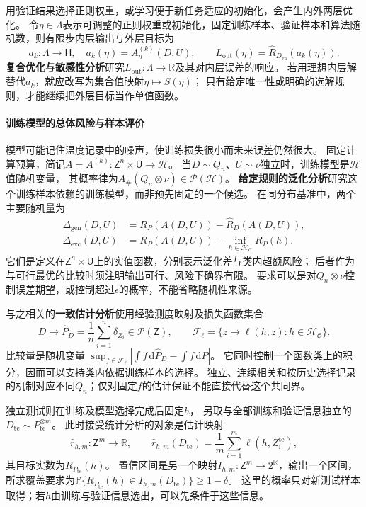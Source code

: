 用验证结果选择正则权重，或学习便于新任务适应的初始化，会产生内外两层优化。
令$\eta\in\Lambda$表示可调整的正则权重或初始化，固定训练样本、验证样本和算法随机数，则有限步内层输出与外层目标为
\[
  a_k:\Lambda\to\mathsf H,\quad a_k(\eta)=A_\eta^{(k)}(D,U),
  \qquad L_{\mathrm{out}}(\eta)=\widehat R_{D_{\mathrm{va}}}(a_k(\eta)).
\]
\textbf{复合优化与敏感性分析}研究$L_{\mathrm{out}}:\Lambda\to\mathbb R$及其对内层误差的响应。
若用理想内层解替代$a_k$，就应改写为集合值映射$\eta\mapsto S(\eta)$；
只有给定唯一性或明确的选解规则，才能继续把外层目标当作单值函数。

\paragraph{训练模型的总体风险与样本评价}
\label{sec:future-ml-generalization-evaluation}

模型可能记住温度记录中的噪声，使训练损失很小而未来误差仍然很大。
固定计算预算，简记$A=A^{(k)}:\mathsf Z^n\times\mathsf U\to\mathcal H$。
当$D\sim Q_n$、$U\sim\nu$独立时，训练模型是$\mathcal H$值随机变量，
其概率律为$A_{\#}(Q_n\otimes\nu)\in\mathcal P(\mathcal H)$。
\textbf{给定规则的泛化分析}研究这个训练样本依赖的训练模型，而非预先固定的一个候选。
在同分布基准中，两个主要随机量为
\[
  \begin{aligned}
    \Delta_{\mathrm{gen}}(D,U)
      &=R_P(A(D,U))-\widehat R_D(A(D,U)),\\
    \Delta_{\mathrm{exc}}(D,U)
      &=R_P(A(D,U))-\inf_{h\in\mathcal H_{\mathcal C}}R_P(h).
  \end{aligned}
\]
它们是定义在$\mathsf Z^n\times\mathsf U$上的实值函数，分别表示泛化差与类内超额风险；
后者作为与可行最优的比较时须注明输出可行、风险下确界有限。
要求可以是对$Q_n\otimes\nu$控制误差期望，或控制超过$\epsilon$的概率，不能省略随机性来源。

与之相关的\textbf{一致估计分析}使用经验测度映射及损失函数集合
\[
  D\mapsto\widehat P_D=\frac1n\sum_{i=1}^n\delta_{Z_i}
     \in\mathcal P(\mathsf Z),\qquad
  \mathcal F_\ell=\{z\mapsto\ell(h,z):h\in\mathcal H_{\mathcal C}\}.
\]
比较量是随机变量
$\sup_{f\in\mathcal F_\ell}|\int f\,\mathrm d\widehat P_D-\int f\,\mathrm dP|$。
它同时控制一个函数类上的积分，因而可以支持类内依据训练样本的选择。
独立、连续相关和按历史选择记录的机制对应不同$Q_n$；仅对固定$f$的估计保证不能直接代替这个共同界。

独立测试则在训练及模型选择完成后固定$h$，
另取与全部训练和验证信息独立的$D_{\mathrm{te}}\sim P_{\mathrm{te}}^{\otimes m}$。
此时接受统计分析的对象是估计映射
\[
  \widehat r_{h,m}:\mathsf Z^m\to\mathbb R,
  \qquad \widehat r_{h,m}(D_{\mathrm{te}})
       =\frac1m\sum_{i=1}^m\ell(h,Z_i^{\mathrm{te}}),
\]
其目标实数为$R_{P_{\mathrm{te}}}(h)$。
置信区间是另一个映射$I_{h,m}:\mathsf Z^m\to2^{\mathbb R}$，输出一个区间，
所求覆盖要求为$\mathbb P\{R_{P_{\mathrm{te}}}(h)\in I_{h,m}(D_{\mathrm{te}})\}\geq1-\delta$。
这里的概率只对新测试样本取得；若$h$由训练与验证信息选出，可以先条件于这些信息。

